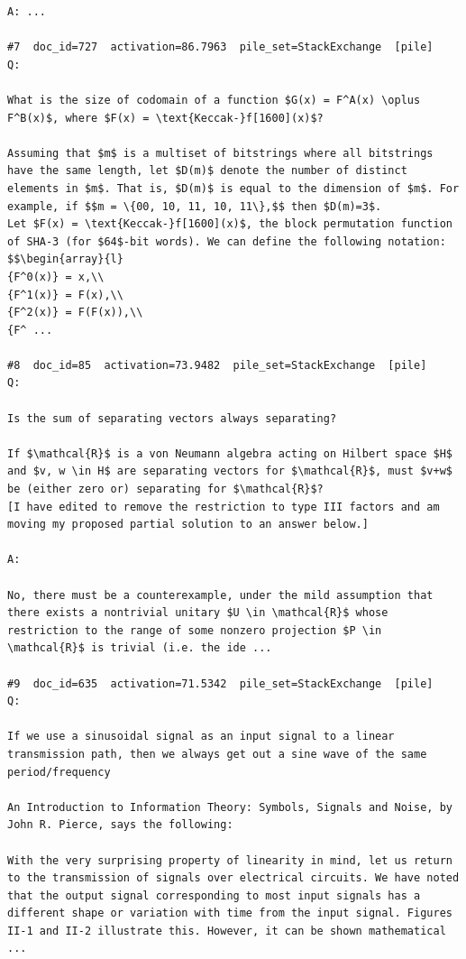 \begin{verbatim}
A: ...

#7  doc_id=727  activation=86.7963  pile_set=StackExchange  [pile]
Q:

What is the size of codomain of a function $G(x) = F^A(x) \oplus F^B(x)$, where $F(x) = \text{Keccak-}f[1600](x)$?

Assuming that $m$ is a multiset of bitstrings where all bitstrings have the same length, let $D(m)$ denote the number of distinct elements in $m$. That is, $D(m)$ is equal to the dimension of $m$. For example, if $$m = \{00, 10, 11, 10, 11\},$$ then $D(m)=3$.  
Let $F(x) = \text{Keccak-}f[1600](x)$, the block permutation function of SHA-3 (for $64$-bit words). We can define the following notation: $$\begin{array}{l}
{F^0(x)} = x,\\
{F^1(x)} = F(x),\\
{F^2(x)} = F(F(x)),\\
{F^ ...

#8  doc_id=85  activation=73.9482  pile_set=StackExchange  [pile]
Q:

Is the sum of separating vectors always separating?

If $\mathcal{R}$ is a von Neumann algebra acting on Hilbert space $H$ and $v, w \in H$ are separating vectors for $\mathcal{R}$, must $v+w$ be (either zero or) separating for $\mathcal{R}$?
[I have edited to remove the restriction to type III factors and am moving my proposed partial solution to an answer below.]

A:

No, there must be a counterexample, under the mild assumption that there exists a nontrivial unitary $U \in \mathcal{R}$ whose restriction to the range of some nonzero projection $P \in \mathcal{R}$ is trivial (i.e. the ide ...

#9  doc_id=635  activation=71.5342  pile_set=StackExchange  [pile]
Q:

If we use a sinusoidal signal as an input signal to a linear transmission path, then we always get out a sine wave of the same period/frequency

An Introduction to Information Theory: Symbols, Signals and Noise, by John R. Pierce, says the following:

With the very surprising property of linearity in mind, let us return to the transmission of signals over electrical circuits. We have noted that the output signal corresponding to most input signals has a different shape or variation with time from the input signal. Figures II-1 and II-2 illustrate this. However, it can be shown mathematical ...


\end{verbatim}
